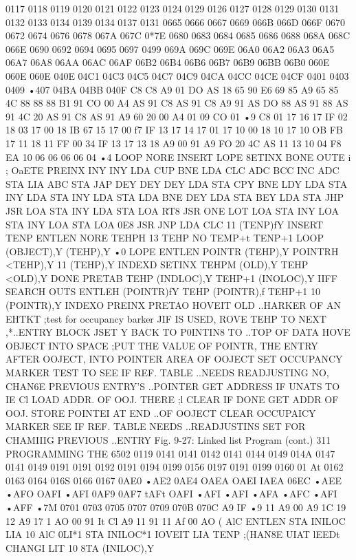 \documentclass{book}
\begin{document}
{{{{{{{{{0117
0118
0119
0120
0121
0122
0123
0124
0129
0126
0127
0128
0129
0130
0131
0132
0133
0134
0139
0134
0137
0131
0665
0666
0667
0669
066B
066D
066F
0670
0672
0674
0676
0678
067A
067C
0*7E
0680
0683
0684
0685
0686
0688
068A
068C
066E
0690
0692
0694
0695
0697
0499
069A
069C
069E
06A0
06A2
06A3
06A5
06A7
06A8
06AA
06AC
06AF
06B2
06B4
06B6
06B7
06B9
06BB
06B0
060E
060E
060E
040E
04C1
04C3
04C5
04C7
04C9
04CA
04CC
04CE
04CF
0401
0403
0409
•407
04BA
04BB
040F
C8
C8
A9
01
DO
AS
18
65
90
E6
69
85
A9
65
85
4C
88
88
88
B1
91
CO
00
A4
AS
91
C8
AS
91
C8
A9
91
AS
DO
88
AS
91
88
AS
91
4C
20
AS
91
C8
AS
91
A9
60
20
00
A4
01
09
CO
01
•9
C8
01
17
16
17
IF
02
18
03
17
00
18
IB
67
15
17
00
f7
IF
13
17
14
17
01
17
10
00
18
10
17
10
OB
FB
17
11
18
11
FF
00
34
IF
13
17
13
18
A9 00
91
A9
FO
20
4C
AS
11
13
10
04
F8
EA
10
06
06
06
06
04
•4
LOOP
NORE
INSERT
LOPE
8ETINX
BONE
OUTE
i
;
OaETE
PREINX
INY
INY
LDA
CUP
BNE
LDA
CLC
ADC
BCC
INC
ADC
STA
LIA
ABC
STA
JAP
DEY
DEY
DEY
LDA
STA
CPY
BNE
LDY
LDA
STA
INY
LDA
STA
INY
LDA
STA
LDA
BNE
DEY
LDA
STA
BEY
LDA
STA
JHP
JSR
LOA
STA
INY
LDA
STA
LOA
RT8
JSR
ONE
LOT
LOA
STA
INY
LOA
STA
INY
LOA
STA
LOA
0E8
JSR
JNP
LDA
CLC
11
(TENP)fY
INSERT
TENP
ENTLEN
NORE
TEHPH
13
TEHP
NO
TEMP+t
TENP+1
LOOP
(OBJECT),Y
(TEHP),Y
•0
LOPE
ENTLEN
POINTR
(TEHP),Y
POINTRH
<TEHP),Y
11
(TEHP),Y
INDEXD
SETINX
TEHPM
(OLD),Y
TEHP
<OLD),Y
DONE
PRETAB
TEHP
(INDLOC),Y
TEHP+1
(INOLOC),Y
IIFF
SEARCH
OUTS
ENTLEH
(POINTR)fY
TEHP
(POINTR),f
TEHP+1
10
(POINTR),Y
INDEXO
PREINX
PRETAO
HOVEIT
OLD
{..HARKER OF AN EHTKT
;test for occupancy barker
JIF IS USED, ROVE TEHP TO NEXT
,*..ENTRY BLOCK
JSET Y BACK TO P0INTIN8 TO
{..TOP OF DATA
{HOVE OBJECT INTO SPACE
;PUT THE VALUE OF POINTR, THE
{ENTRY AFTER OOJECT, INTO
{POINTER AREA OF OOJECT
{SET OCCUPANCY MARKER
{TEST TO SEE IF REF. TABLE
{..NEEDS READJUSTING
{NO, CHAN6E PREVIOUS ENTRY'S
{..POINTER
{GET ADDRESS IF UNATS TO IE Cl
{LOAD ADDR. OF OOJ. THERE
;l CLEAR IF DONE
{GET ADDR OF OOJ.
{STORE POINTEI AT END
{..OF OOJECT
{CLEAR OCCUPAICY MARKER
{SEE IF REF. TABLE NEEDS
{..READJUSTINS
{SET FOR CHAMIIIG PREVIOUS
{..ENTRY
Fig. 9-27: Linked list Program (cont.)
311
PROGRAMMING THE 6502
0119
0141
0141
0142
0141
0144
0149
014A
0147
0141
0149
0191
0191
0192
0191
0194
0199
0156
0197
0191
0199
0160
01 At
0162
0163
0164
016S
0166
0167
0AE0
•AE2
0AE4
OAEA
OAEI
IAEA
06EC
•AEE
•AFO
OAFI
•AFI
0AF9
0AF7
tAFt
OAFI
•AFI
•AFI
•AFA
•AFC
•AFI
•AFF
•7M
0701
0703
0705
0707
0709
070B
070C
A9 IF
•9 11
A9 00
A9 1C
19 12
A9 17 1
AO 00
91 It
Cl
A9 11
91 11
Af 00
AO (
AlC ENTLEN
STA INILOC
LIA 10
AlC 0LI*1
STA INILOC*1
IOVEIT LIA TENP ;(HAN8E UIAT lEEDt CHANGI
LIT 10
8TA (INILOC),Y
}}}}}}}}}}}}}}}}}}}}}}}}}}}}}
\end{document}
